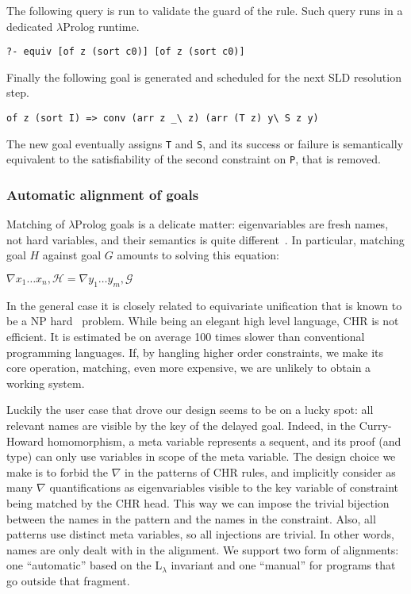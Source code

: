 \documentclass{easychair}
\begin{document}
The following query is run to validate the guard of the rule.
Such query runs in a dedicated $\lambda$Prolog runtime.

\begin{verbatim}
?- equiv [of z (sort c0)] [of z (sort c0)]
\end{verbatim}

Finally the following  goal is generated and scheduled for the next
SLD resolution step.

\begin{verbatim}
of z (sort I) => conv (arr z _\ z) (arr (T z) y\ S z y)
\end{verbatim}

The new goal eventually assigns \verb+T+ and \verb+S+, and its success
or failure is semantically equivalent to the satisfiability of the
second constraint on \verb+P+, that is removed.

\subsubsection{Automatic alignment of goals}
\label{sec:realchr}

Matching of $\lambda$Prolog goals is a delicate matter: eigenvariables
are fresh names, not hard variables, and their semantics is quite
different~\cite{nabla}.  
In particular, matching goal $H$ against goal $G$ amounts
to solving this equation:

\begin{math}
 \nabla x_1\ldots x_n, \mathcal{H} = \nabla y_1\ldots y_m, \mathcal{G}
\end{math}

In the general case it is closely related to equivariate unification
that is known to be a NP hard~\cite{Cheney2004} problem.  While being
an elegant high level language, CHR is not efficient.  It is estimated
be on average 100 times slower than conventional programming
languages.  If, by hangling higher order constraints, we make its core
operation, matching, even more expensive, we are unlikely to obtain a
working system.

Luckily the user case that drove our design seems to be on a lucky
spot: all relevant names are visible by the key of the delayed goal.
Indeed, in the Curry-Howard homomorphism, a meta variable represents a
sequent, and its proof (and type) can only use variables in scope of
the meta variable.  The design choice we make is to forbid the
$\nabla$ in the patterns of CHR rules, and implicitly consider as many
$\nabla$ quantifications as eigenvariables visible to the key variable
of constraint being matched by the CHR head.  This way we can impose
the trivial bijection between the names in the pattern and the names
in the constraint.  Also, all patterns use distinct meta variables, so
all injections are trivial.  In other words, names are only dealt with
in the alignment.
We support two form of alignments: one ``automatic'' based on the
L$_\lambda$ invariant and one ``manual'' for programs that go
outside that fragment.
\end{document}
